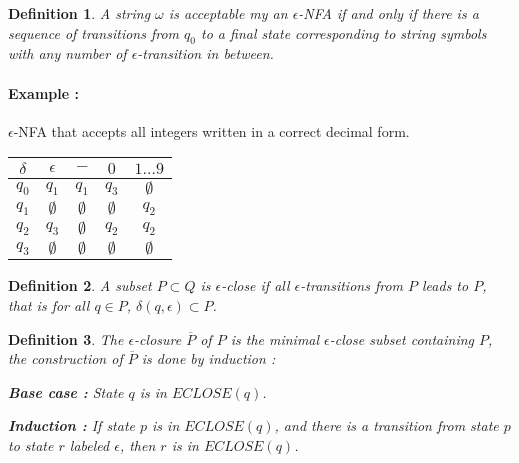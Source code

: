 \documentclass[a4paper,11pt]{article}
\newtheorem{mydef}{Definition}
\begin{document}
\begin{mydef}
  A string $\omega$ is acceptable my an $\epsilon$-NFA if and only if there is a
  sequence of transitions from $q_0$ to a final state corresponding to string
  symbols with any number of $\epsilon$-transition in between.
\end{mydef}

\paragraph{Example :} $\epsilon$-NFA that accepts all integers written in a
correct decimal form.

\begin{center}
\end{center}

\begin{center}
  \begin{tabular}{c|cccc}
    $\delta$ & $\epsilon$  & $-$         & $0$         & $1 \dots 9$ \\ \hline
    $q_0$    & $q_1$       & $q_1$       & $q_3$       & $\emptyset$ \\
    $q_1$    & $\emptyset$ & $\emptyset$ & $\emptyset$ & $q_2$       \\
    $q_2$    & $q_3$       & $\emptyset$ & $q_2$       & $q_2$       \\
    $q_3$    & $\emptyset$ & $\emptyset$ & $\emptyset$ & $\emptyset$
  \end{tabular}
\end{center}

\begin{mydef}
  A subset $P \subset Q$ is $\epsilon$-close if all $\epsilon$-transitions from
  $P$ leads to $P$, that is for all $q \in P$, $\delta(q,\epsilon) \subset P$.
\end{mydef}

\begin{mydef}
  The $\epsilon$-closure $\overline P$ of $P$ is the minimal
  $\epsilon$-close subset containing $P$, the construction of $\overline{P}$ is
  done by induction :
  
  \textbf{Base case : } State $q$ is in $ECLOSE(q)$.
  
  \textbf{Induction : } If state $p$ is in $ECLOSE(q)$, and there is a
  transition from state $p$ to state $r$ labeled $\epsilon$, then $r$ is in $ECLOSE(q)$.
\end{mydef}
\end{document}
